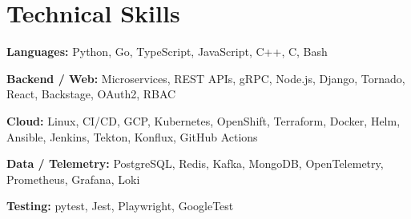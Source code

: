\section{Technical Skills}
\textbf{Languages:} Python, Go, TypeScript, JavaScript, C++, C, Bash\par
\textbf{Backend / Web:} Microservices, REST APIs, gRPC, Node.js, Django, Tornado, React, Backstage, OAuth2, RBAC\par
\textbf{Cloud:} Linux, CI/CD, GCP, Kubernetes, OpenShift, Terraform, Docker, Helm, Ansible, Jenkins, Tekton, Konflux, GitHub Actions\par
\textbf{Data / Telemetry:} PostgreSQL, Redis, Kafka, MongoDB, OpenTelemetry, Prometheus, Grafana, Loki\par
\textbf{Testing:} pytest, Jest, Playwright, GoogleTest\par
